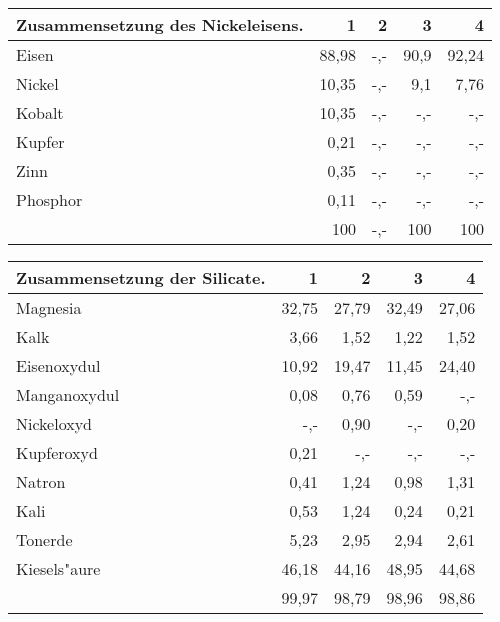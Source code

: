 \documentclass[a4paper, 11pt, oneside, german]{article}
\begin{document}
\vspace{\medskipamount}
\begin{center}
\begin{tabular}{ |l|r|r|r|r| }
    \hline
    Zusammensetzung des Nickeleisens. & 1 & 2 & 3 & 4\\
    \hline\hline
    Eisen & 88,98 & -,- & 90,9 & 92,24\\\hline
    Nickel & 10,35 & -,- & 9,1 & 7,76\\\hline
    Kobalt & 10,35 & -,- & -,- & -,-\\\hline
    Kupfer & 0,21 & -,- & -,- & -,-\\\hline
    Zinn & 0,35 & -,- & -,- & -,-\\\hline
    Phosphor & 0,11 & -,- & -,- & -,-\\\hline
     & 100 & -,- & 100 & 100\\
    \hline
\end{tabular}
\end{center}
\vspace{\medskipamount}
\begin{center}
\begin{tabular}{ |l|r|r|r|r| }
    \hline
    Zusammensetzung der Silicate. & 1 & 2 & 3 & 4\\
    \hline\hline
    Magnesia & 32,75 & 27,79 & 32,49 & 27,06\\\hline
    Kalk & 3,66 & 1,52 & 1,22 & 1,52\\\hline
    Eisenoxydul & 10,92 & 19,47 & 11,45 & 24,40\\\hline
    Manganoxydul & 0,08 & 0,76 & 0,59 & -,-\\\hline
    Nickeloxyd & -,- & 0,90 & -,- & 0,20\\\hline
    Kupferoxyd & 0,21 & -,- & -,- & -,-\\\hline
    Natron & 0,41 & 1,24 & 0,98 & 1,31\\\hline
    Kali & 0,53 & 1,24 & 0,24 & 0,21\\\hline
    Tonerde & 5,23 & 2,95 & 2,94 & 2,61\\\hline
    Kiesels"aure & 46,18 & 44,16 & 48,95 & 44,68\\\hline
     & 99,97 & 98,79 & 98,96 & 98,86\\
    \hline
\end{tabular}
\end{center}
\end{document}
